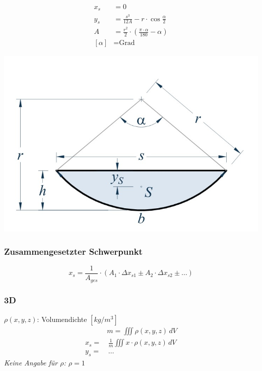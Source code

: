     
    \begin{minipage}{0.49\linewidth}
        \begin{align*}
        x_s &= 0 \\
        y_s &= \frac{s^3}{12 A} - r\cdot \cos{\frac{\alpha}{2}}\\ 
        A &= \frac{r^2}{2} \cdot \left( \frac{\pi \cdot \alpha}{180}- \alpha \right)\\
        \left[  \alpha \right] &= \textrm{Grad}
        \end{align*}
    \end{minipage}
    \begin{minipage}{0.49\linewidth}
        \includegraphics[width = \linewidth]{src/Mehrdimensionale-Funktionen_Integralrechnung/Kreissegment.jpeg}
    \end{minipage}
    
    \subsubsection{Zusammengesetzter Schwerpunkt}
    $$ x_s = \frac{1}{A_{ges}} \cdot \left( A_1 \cdot \Delta x_{s1} \pm A_2 \cdot \Delta x_{s2} \pm \dots \right) $$
    
    \subsubsection{3D}
    $\rho(x,y,z)$: Volumendichte $[kg/m^3 ] $
        \begin{align*}
            &m = \iiint \rho(x,y,z) \, dV\\[0.25em]
            x_s =&\, \frac{1}{m} \iiint x \cdot \rho(x,y,z) \, dV\\
            y_s =&\, \dots
        \end{align*}
        \vspace{-0.45em}
    \textit{Keine Angabe für $\rho$: $\rho = 1$}
    \vspace{0.5em}
    
    \cbreak
        

        